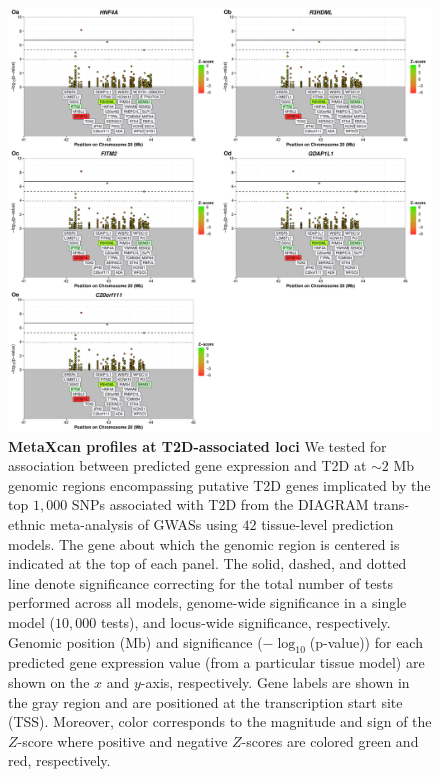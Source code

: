 \documentclass[10pt]{article}
\begin{document}
\begin{figure}
\ContinuedFloat
\includegraphics[width=\textwidth]{sup_fig1_part15_locusArray.pdf}
	\caption{\textbf{MetaXcan profiles at T2D-associated loci} We tested for association between predicted gene expression and T2D at $\sim2$ Mb genomic regions encompassing putative T2D genes implicated by the top $1,000$ SNPs associated with T2D from the DIAGRAM trans-ethnic meta-analysis of GWASs using $42$ tissue-level prediction models. The gene about which the genomic region is centered is indicated at the top of each panel. The solid, dashed, and dotted line denote significance correcting for the total number of tests performed across all models, genome-wide significance in a single model ($10,000$ tests), and locus-wide significance, respectively. Genomic position (Mb) and significance ($-\log_{10}$(p-value)) for each predicted gene expression value (from a particular tissue model) are shown on the $x$ and $y$-axis, respectively. Gene labels are shown in the gray region and are positioned at the transcription start site (TSS). Moreover, color corresponds to the magnitude and sign of the $Z$-score where positive and negative $Z$-scores are colored green and red, respectively.} 
    \label{fig:supp.locus_array_fig1_part15}
\end{figure}

\end{document}
